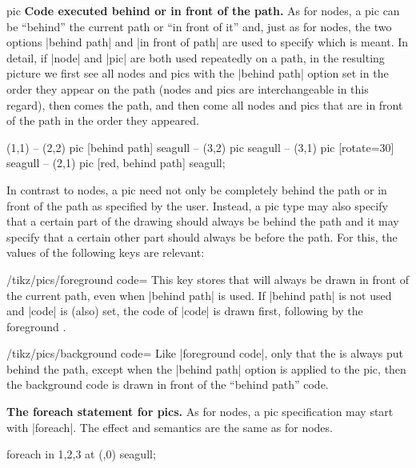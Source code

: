 \begin{pathoperation}{pic}
    \medskip
    \textbf{Code executed behind or in front of the path.}
    As for nodes, a pic can be ``behind'' the current path or ``in front of
    it'' and, just as for nodes, the two options |behind path| and
    |in front of path| are used to specify which is meant. In detail, if |node|
    and |pic| are both used repeatedly on a path, in the resulting picture we
    first see all nodes and pics with the |behind path| option set in the order
    they appear on the path (nodes and pics are interchangeable in this
    regard), then comes the path, and then come all nodes and pics that are in
    front of the path in the order they appeared.
\begin{codeexample}[
    pre={\tikzset{
  seagull/.pic={
    \draw (-3mm,0) to [bend left] (0,0) to [bend left] (3mm,0);
  },
}}]
\tikz \fill [fill=blue!20]
     (1,1)
  -- (2,2) pic [behind path]      {seagull}
  -- (3,2) pic                    {seagull}
  -- (3,1) pic [rotate=30]        {seagull}
  -- (2,1) pic [red, behind path] {seagull};
\end{codeexample}
    In contrast to nodes, a pic need not only be completely behind the path or
    in front of the path as specified by the user. Instead, a pic type may also
    specify that a certain part of the drawing should always be behind the path
    and it may specify that a certain other part should always be before the
    path. For this, the values of the following keys are relevant:

    \begin{key}{/tikz/pics/foreground code=}
        This key stores  that will always be drawn in front of the
        current path, even when |behind path| is used. If |behind path| is not
        used and |code| is (also) set, the code of |code| is drawn first,
        following by the foreground .
    \end{key}

    \begin{key}{/tikz/pics/background code=}
        Like |foreground code|, only that the  is always put behind
        the path, except when the |behind path| option is applied to the pic,
        then the background code is drawn in front of the ``behind path'' code.
    \end{key}

    \medskip
    \textbf{The foreach statement for pics.}
    As for nodes, a pic specification may start with |foreach|. The effect and
    semantics are the same as for nodes.
\begin{codeexample}[
    pre={\tikzset{
  seagull/.pic={
    \draw (-3mm,0) to [bend left] (0,0) to [bend left] (3mm,0);
  },
}}]
\tikz \pic foreach \x in {1,2,3} at (\x,0) {seagull};
\end{codeexample}


\end{pathoperation}
